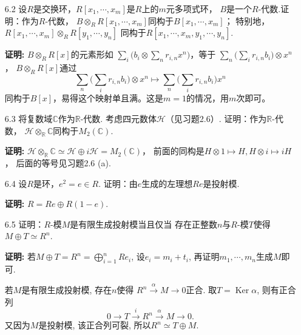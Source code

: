 \begin{enumerate}
    \item[6.2] 设$R$是交换环，$R[x_1,\cdots,x_m]$是$R$上的$m$元多项式环，
        $B$是一个$R$-代数.证明：作为$R$-代数，
        $B\otimes_R R[x_1,\cdots,x_m]$同构于$B[x_1,\cdots,x_m]$；
        特别地，$R[x_1,\cdots,x_m]\otimes_R R[y_1,\cdots,y_n]$
        同构于$R[x_1,\cdots,x_m,y_1,\cdots,y_n]$.
    \item[\textbf{证明:}]
        $B\otimes_RR[x]$的元素形如
        $\sum\limits_i\Big(b_i\otimes\sum\limits_nr_{i,n}x^n\Big)$，等于
        $\sum\limits_n\big(\sum\limits_ir_{i,n}b_i\big)\otimes x^n$，
        $B\otimes_RR[x]$通过
        $$\textstyle \sum\limits_n\big(\sum\limits_ir_{i,n}b_i\big)\otimes x^n
        \mapsto \sum\limits_n\big(\sum\limits_ir_{i,n}b_i\big)x^n$$
        同构于$B[x]$，易得这个映射单且满。这是$m=1$的情况，用$m$次即可。

    \item[6.3] 将复数域$\mathbb{C}$作为$\mathbb{R}$-代数. 
        考虑四元数体$\mathcal{H}$（见习题2.6）. 证明：作为$\mathbb{R}$-代数，
        $\mathcal{H}\otimes_\mathbb{R}\mathbb{C}$同构于$M_2(\mathbb{C})$.
        \item[\textbf{证明:}]
        $\mathcal{H}\otimes_\mathbb{R}\mathbb{C}\simeq
        \mathcal{H}\oplus i\mathcal{H}=M_2(\mathbb{C})$，
        前面的同构是$H\otimes1\mapsto H,H\otimes i\mapsto iH$，
        后面的等号见习题2.6 (a).

    \item[6.4] 设$R$是环，$e^2=e\in R$. 证明：由$e$生成的左理想$Re$是投射模.
    \item[\textbf{证明:}] $R=Re\oplus R(1-e)$.

    \item[6.5] 证明：$R$-模$M$是有限生成投射模当且仅当
    存在正整数$n$与$R$-模$T$使得$M\oplus T\simeq R^n$.
    \item[\textbf{证明:}] 若$M\oplus T=R^n=\bigoplus\limits_{i=1}^n Re_i$, 
        设$e_i=m_i+t_i$, 再证明$m_1,\cdots,m_n$生成$M$即可.\par
        若$M$是有限生成投射模, 存在$n$使得
        $R^n\stackrel{\alpha}{\rightarrow} M\rightarrow 0$正合. 
        取$T=\operatorname{Ker} \alpha$, 则有正合列
        $$0\rightarrow T\stackrel{i}{\rightarrow} R^n
        \stackrel{\alpha}{\rightarrow} M\rightarrow 0.$$
        又因为$M$是投射模, 该正合列可裂, 所以$R^n\simeq T\oplus M$.


\end{enumerate}
